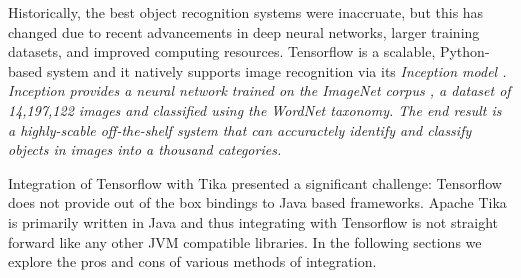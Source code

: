 Historically, the best object recognition systems were inaccruate, but this has changed due to recent advancements in deep neural networks, larger training datasets, and improved computing resources. Tensorflow is a scalable, Python-based system and it natively supports image recognition via its \em {Inception} model \cite{abadi2016tensorflow}. \em{Inception} provides a neural network trained on the ImageNet corpus \cite{krizhevsky2012imagenet}, a dataset of 14,197,122 images and classified using the WordNet taxonomy. The end result is a highly-scable off-the-shelf system that can accuractely identify and classify objects in images into a thousand categories. 

Integration of Tensorflow with Tika presented a significant challenge: Tensorflow does not provide out of the box bindings to Java based frameworks. Apache Tika is primarily written in Java and thus integrating with Tensorflow is not straight forward like any other JVM compatible libraries. In the following sections we explore the pros and cons of various methods of integration.



